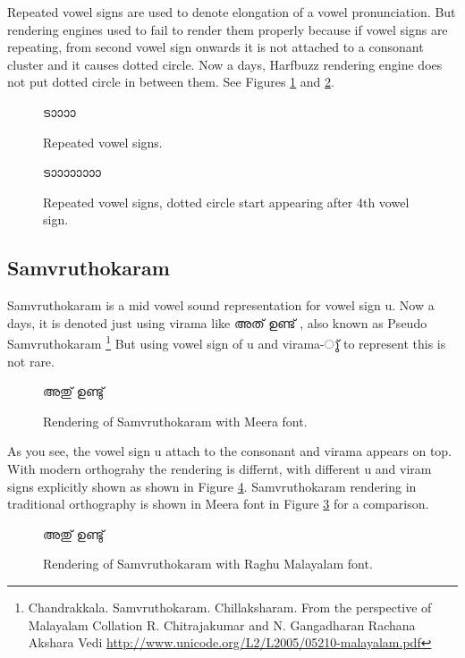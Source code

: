 Repeated vowel signs are used to denote elongation of a vowel pronunciation.
But rendering engines used to fail to render them properly because if vowel
signs are repeating, from second vowel sign onwards it is not attached to a
consonant cluster and it causes dotted circle. Now a days, Harfbuzz rendering
engine does not put dotted circle in between them. See Figures
\ref{elongatedvowel-dotted} and \ref{elongated-nodotted}.

\begin{figure}[h]
  \centering
  {\meera\textexample ടാാാാ}\\
  \caption{Repeated vowel signs.}
  \label{elongatedvowel-dotted}
\end{figure}

\begin{figure}[h]
  \centering
  {\meera\textexample ടാാാാാാാാ}\\
  \caption{Repeated vowel signs, dotted circle start appearing after 4th vowel sign.}
  \label{elongated-nodotted}
\end{figure}


\subsection {Samvruthokaram}
\label{Samvruthokaram}
Samvruthokaram is a mid vowel sound representation for vowel sign u. Now a
days, it is denoted just using virama like {\malayalam അത് ഉണ്ട് }, also known as
Pseudo Samvruthokaram
\footnote{Chandrakkala. Samvruthokaram. Chillaksharam.
From the perspective of Malayalam Collation
R. Chitrajakumar and N. Gangadharan
Rachana Akshara Vedi \url{http://www.unicode.org/L2/L2005/05210-malayalam.pdf}}
But using vowel sign of u and virama-{\malayalam ു്} to represent this is not
rare.

\begin{figure}[h!]
  \centering
  {\meera\textexample  അതു് ഉണ്ടു് }\\
  \caption{Rendering of Samvruthokaram with Meera font.}
  \label{SamvruthokaramTraditional}
\end{figure}

As you see, the vowel sign u attach to the consonant and virama appears on top.
With modern orthograhy the rendering is differnt, with different u and viram
signs explicitly shown as shown in Figure \ref{SamvruthokaramModern}.
Samvruthokaram rendering in traditional orthography is shown in Meera font in
Figure \ref{SamvruthokaramTraditional} for a comparison.

\begin{figure}[h!]
  \centering
  {\raghumalayalam\textexample  അതു് ഉണ്ടു് }\\
  \caption{Rendering of Samvruthokaram with Raghu Malayalam font.}
  \label{SamvruthokaramModern}
\end{figure}

